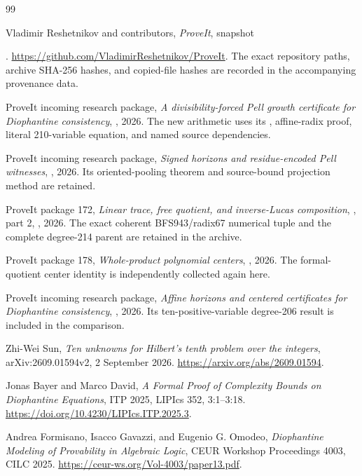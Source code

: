 \begin{thebibliography}{99}
\raggedright
{}
Vladimir Reshetnikov and contributors,
\emph{ProveIt}, snapshot\par
{\small{}}.
\url{https://github.com/VladimirReshetnikov/ProveIt}.
The exact repository paths, archive SHA-256 hashes, and copied-file hashes
are recorded in the accompanying provenance data.

ProveIt incoming research package,
\emph{A divisibility-forced Pell growth certificate for Diophantine
consistency}, , 2026.
The new arithmetic uses its , affine-radix
proof, literal 210-variable equation, and named source dependencies.

ProveIt incoming research package,
\emph{Signed horizons and residue-encoded Pell witnesses},
, 2026.
Its oriented-pooling theorem and source-bound projection method are retained.

ProveIt package 172,
\emph{Linear trace, free quotient, and inverse-Lucas composition},
, part 2, , 2026.
The exact coherent BFS943/radix67 numerical tuple and the complete
degree-214 parent are retained in the archive.

ProveIt package 178,
\emph{Whole-product polynomial centers},
, 2026.
The formal-quotient center identity is independently collected again here.

ProveIt incoming research package,
\emph{Affine horizons and centered certificates for Diophantine consistency},
, 2026.
Its ten-positive-variable degree-206 result is included in the comparison.

Zhi-Wei Sun,
\emph{Ten unknowns for Hilbert's tenth problem over the integers},
arXiv:2609.01594v2, 2 September 2026.
\url{https://arxiv.org/abs/2609.01594}.

Jonas Bayer and Marco David,
\emph{A Formal Proof of Complexity Bounds on Diophantine Equations},
ITP 2025, LIPIcs 352, 3:1--3:18.
\url{https://doi.org/10.4230/LIPIcs.ITP.2025.3}.

Andrea Formisano, Isacco Gavazzi, and Eugenio G. Omodeo,
\emph{Diophantine Modeling of Provability in Algebraic Logic},
CEUR Workshop Proceedings 4003, CILC 2025.
\url{https://ceur-ws.org/Vol-4003/paper13.pdf}.
\end{thebibliography}
